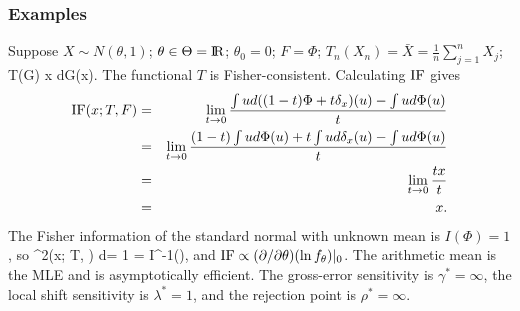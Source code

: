 \subsubsection{Examples}
Suppose $X \sim N(\theta, 1)$; $\theta \in \Theta = \hbox{I\kern-.17em\hbox{R}}$; $\theta_0 = 0$;
$F = \Phi$;
$T_n(X_n) = \bar{X} = \frac{1}{n} \sum_{j=1}^n X_j$;
\beq
    T(G) \equiv \int x dG(x).
\eeq
The functional $T$ is Fisher-consistent.
Calculating ${\rm IF}$ gives
\begin{eqnarray}
    {\rm IF}(x; T, F)  &=& \lim_{t \rightarrow 0}
    \frac{\int u d((1-t) \Phi + t \delta_x ) (u) - \int u d\Phi(u)}{t} \nonumber \\
    &=& \lim_{t \rightarrow 0 } \frac{(1-t) \int u d\Phi(u) + t \int u d\delta_x(u) - \int u
    d\Phi(u)}{t} \nonumber \\
    &=& \lim_{t \rightarrow 0} \frac{tx}{t} \nonumber \\
    &=& x.
\end{eqnarray}
The Fisher information of the standard normal with unknown mean is $I(\Phi) =1$, so
\beq
    \int \IF^2(x; T, \Phi) d\Phi = 1 = I^{-1}(\Phi),
\eeq
and ${\rm IF} \propto (\partial/\partial \theta) (\ln f_\theta)|_0$.
The arithmetic mean is the MLE and is asymptotically efficient.
The gross-error sensitivity is $\gamma^* = \infty$, the local shift sensitivity
is $\lambda^* = 1$, and the   rejection point is $\rho^* = \infty$.


